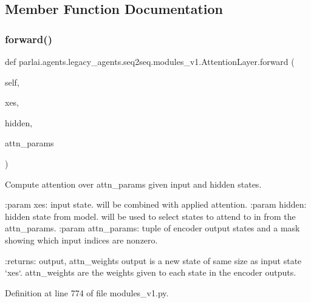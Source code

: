 \subsection{Member Function Documentation}
\mbox{\label{classparlai_1_1agents_1_1legacy__agents_1_1seq2seq_1_1modules__v1_1_1AttentionLayer_ad6041bd52e148a4dfe894b71f79937c0}} 
\subsubsection{\texorpdfstring{forward()}{forward()}}
{\footnotesize\ttfamily def parlai.\+agents.\+legacy\+\_\+agents.\+seq2seq.\+modules\+\_\+v1.\+Attention\+Layer.\+forward (\begin{DoxyParamCaption}\item[{}]{self,  }\item[{}]{xes,  }\item[{}]{hidden,  }\item[{}]{attn\+\_\+params }\end{DoxyParamCaption})}

\begin{DoxyVerb}Compute attention over attn_params given input and hidden states.

:param xes:         input state. will be combined with applied
            attention.
:param hidden:      hidden state from model. will be used to select
            states to attend to in from the attn_params.
:param attn_params: tuple of encoder output states and a mask showing
            which input indices are nonzero.

:returns: output, attn_weights
  output is a new state of same size as input state `xes`.
  attn_weights are the weights given to each state in the
  encoder outputs.
\end{DoxyVerb}
 

Definition at line 774 of file modules\+\_\+v1.\+py.



